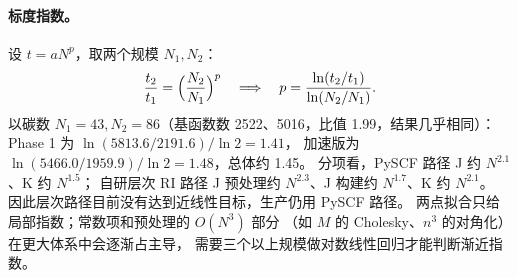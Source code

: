 \paragraph{标度指数。}
设 \(t=aN^p\)，取两个规模 \(N_1,N_2\)：
\begin{equation}
\frac{t_2}{t_1}=\Bigl(\frac{N_2}{N_1}\Bigr)^p
\quad\Longrightarrow\quad
p=\frac{\ln(t_2/t_1)}{\ln(N_2/N_1)} .
\end{equation}
以碳数 \(N_1=43,N_2=86\)（基函数数 2522、5016，比值 1.99，结果几乎相同）：
Phase 1 为 \(\ln(5813.6/2191.6)/\ln2=1.41\)，
加速版为 \(\ln(5466.0/1959.9)/\ln2=1.48\)，总体约 1.45。
分项看，PySCF 路径 J 约 \(N^{2.1}\)、K 约 \(N^{1.5}\)；
自研层次 RI 路径 J 预处理约 \(N^{2.3}\)、J 构建约 \(N^{1.7}\)、K 约 \(N^{2.1}\)。
因此层次路径目前没有达到近线性目标，生产仍用 PySCF 路径。
两点拟合只给局部指数；常数项和预处理的 \(O(N^3)\) 部分
（如 \(M\) 的 Cholesky、\(n^3\) 的对角化）在更大体系中会逐渐占主导，
需要三个以上规模做对数线性回归才能判断渐近指数。
